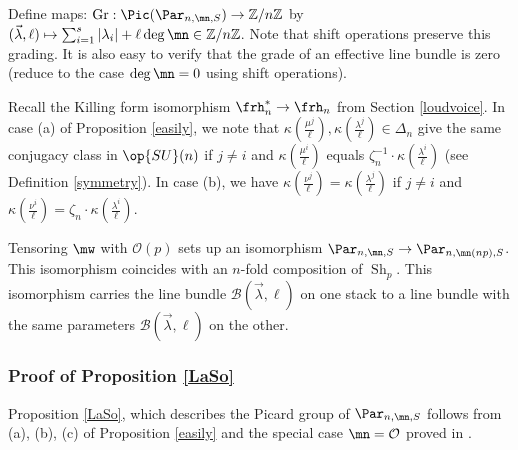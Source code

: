 \begin{defi}
\notready\label{grade} Define maps: $\operatorname{Gr}:\Pic (\Par_{n,\mn,S})\to \Bbb{Z}/n\Bbb{Z}$ by
$(\vec{\lambda},\ell)\mapsto \sum_{i=1}^s|\lambda_i|+ \ell \deg\mn \in\Bbb{Z}/n\Bbb{Z}$. Note that shift operations preserve this grading.  It is also easy to verify that the grade of an effective line bundle is zero (reduce to the case $\deg\mn=0$ using shift operations).
\end{defi}

\begin{remark}
\notready\label{able}
Recall the Killing form isomorphism $\frh_n^*\to \frh_n$ from Section \ref{loudvoice}. In case (a) of Proposition \ref{easily}, we note that $\kappa(\frac{{\mu^j}}{\ell}),\kappa(\frac{\lambda^j}{\ell})\in \Delta_n$ give the same conjugacy class in $\op{SU}(n)$ if $j\neq i$ and $\kappa(\frac{{\mu^i}}{\ell})$ equals  $\zeta_n^{-1}\cdot \kappa(\frac{{\lambda^i}}{\ell})$ (see Definition  \ref{symmetry}). In case (b),
we have  $\kappa(\frac{{\nu^j}}{\ell})=\kappa(\frac{{\lambda^j}}{\ell})$ if $j\neq i$ and $\kappa(\frac{{\nu^i}}{\ell})=\zeta_n\cdot\kappa(\frac{{\lambda^i}}{\ell})$.
\end{remark}
\begin{lemma}
\notready\label{threepointone}
Tensoring $\mw$ with $\mathcal{O}(p)$ sets up an isomorphism $\Par_{n,\mn,S}\to \Par_{n,\mn(np),S}$. This isomorphism coincides with an $n$-fold composition of
$\operatorname{Sh}_p$. This isomorphism carries the line bundle $\mathcal{B}(\vec{\lambda},\ell)$ on one stack
to a line bundle with the same parameters $\mathcal{B}(\vec{\lambda},\ell)$ on the other.
\end{lemma}
\subsubsection{Proof of Proposition \ref{LaSo}}\label{shifty2}
Proposition \ref{LaSo}, which describes the Picard group of $\Par_{n,\mn,S}$ follows from (a), (b), (c) of Proposition \ref{easily} and the special case $\mn=\mathcal{O}$ proved in \cite{LS}.
